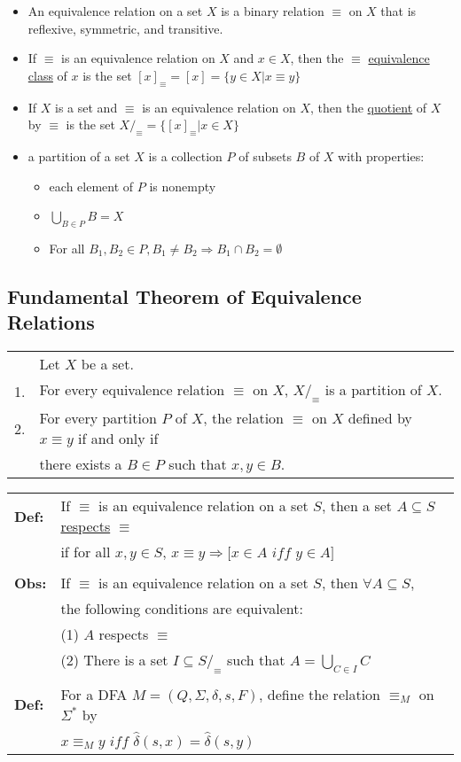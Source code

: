 \documentclass[11pt]{article}
\begin{document}
\begin{itemize}
\item An equivalence relation on a set $X$ is a binary relation $\equiv$ on $X$ that is reflexive, symmetric, and transitive.
\item If $\equiv$ is an equivalence relation on $X$ and $x\in X$, then the $\equiv$ \underline{equivalence class} of $x$ is the set 
$[x]_\equiv = [x]=\{y\in X| x \equiv y\}$
\item If $X$ is a set and $\equiv$ is an equivalence relation on $X$, then the \underline{quotient} of $X$ by $\equiv$ is the set $X/_\equiv=\{[x]_\equiv | x \in X\}$
\item a partition of a set $X$ is a collection $P$ of subsets $B$ of $X$ with properties:
\begin{itemize}
\item each element of $P$ is nonempty
\item $\bigcup\limits_{B\in P} B = X$
\item For all $B_1, B_2 \in P, B_1 \neq B_2 \Rightarrow B_1 \cap B_2 = \emptyset$
\end{itemize}
\end{itemize}

\subsection{Fundamental Theorem of Equivalence Relations}

\begin{tabular}{ll}
& Let $X$ be a set. \\
1. & For every equivalence relation $\equiv$ on $X$, $X/_\equiv$ is a partition of $X$. \\
2. & For every partition $P$ of $X$, the relation $\equiv$ on $X$ defined by $x\equiv y$ if and only if \\
& there exists a $B\in P $ such that $x,y\in B$.
\end{tabular}

\begin{tabular}{ll}
{\bf Def:} & If $\equiv$ is an equivalence relation on a set $S$, then a set $A \subseteq S$ \underline{respects} $\equiv$ \\
& if for all $x,y\in S$, $x \equiv y \Rightarrow [x\in A$ $\textit{iff}$ $y\in A]$ \\
\\
{\bf Obs:} & If $\equiv$ is an equivalence relation on a set $S$, then $\forall A \subseteq S$, \\
& the following conditions are equivalent: \\
& (1) $A$ respects $\equiv$ \\
& (2) There is a set $I\subseteq{S/_\equiv}$ such that $A=\bigcup\limits_{C\in I}C$\\
\\
{\bf Def:} & For a DFA $M=(Q,\Sigma ,\delta ,s, F)$, define the relation $\equiv_M$ on $\Sigma^*$ by \\
& $x\equiv_M y$ $\textit{iff}$ $\hat{\delta}(s,x)=\hat{\delta}(s,y)$
\end{tabular}
\end{document}
